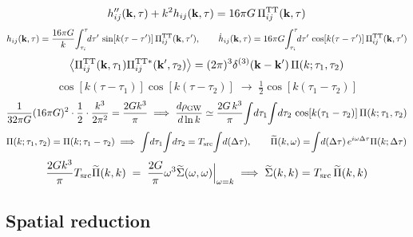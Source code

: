 \documentclass[10pt,prd,aps,nobibnotes,superscriptaddress,preprintnumbers,notitlepage]{revtex4-1}
\newcommand{\kb}{{\bf k}}
\begin{document}
\begin{equation}
  h_{ij}''(\kb,\tau)+k^2h_{ij}(\kb,\tau)=16\pi G\,\Pi^{\rm TT}_{ij}(\kb,\tau)
  \label{A:osc}
\end{equation}
\begin{equation}
  h_{ij}(\kb,\tau)=\frac{16\pi G}{k}\!\int_{\tau_i}^{\tau}\!\!d\tau'\,\sin[k(\tau-\tau')]\,\Pi^{\rm TT}_{ij}(\kb,\tau'),
  \qquad
  \dot h_{ij}(\kb,\tau)=16\pi G\!\int_{\tau_i}^{\tau}\!\!d\tau'\,\cos[k(\tau-\tau')]\,\Pi^{\rm TT}_{ij}(\kb,\tau')
  \label{A:green}
\end{equation}
\begin{equation}
  \bigl\langle\Pi^{\rm TT}_{ij}(\kb,\tau_1)\Pi^{{\rm TT}*}_{ij}(\kb',\tau_2)\bigr\rangle
  =(2\pi)^3\delta^{(3)}(\kb-\kb')\,\Pi(k;\tau_1,\tau_2)
  \label{A:uetc}
\end{equation}
\begin{equation}
  \cos[k(\tau-\tau_1)]\cos[k(\tau-\tau_2)]\;\longrightarrow\;\tfrac12\cos[k(\tau_1-\tau_2)]
  \label{A:average}
\end{equation}
\begin{equation}
  \frac{1}{32\pi G}(16\pi G)^2\cdot\frac12\cdot\frac{k^3}{2\pi^2}=\frac{2Gk^3}{\pi}
  \;\Longrightarrow\;
  \frac{d\rho_{\rm GW}}{d\ln k}\simeq\frac{2G\,k^3}{\pi}\!\int\!d\tau_1\!\int\!d\tau_2\,
  \cos[k(\tau_1-\tau_2)]\,\Pi(k;\tau_1,\tau_2)
  \label{A:master}
\end{equation}
\begin{equation}
  \Pi(k;\tau_1,\tau_2)=\Pi(k;\tau_1-\tau_2)
  \;\Longrightarrow\;
  \int\!d\tau_1\!\int\!d\tau_2=T_{\rm src}\!\int\!d(\Delta\tau),
  \qquad
  \widetilde\Pi(k,\omega)=\!\int\!d(\Delta\tau)\,e^{i\omega\Delta\tau}\Pi(k;\Delta\tau)
  \label{A:stationary}
\end{equation}
\begin{equation}
  \frac{2Gk^3}{\pi}T_{\rm src}\widetilde\Pi(k,k)
  \;=\;\frac{2G}{\pi}\omega^3\widetilde\Sigma(\omega,\omega)\Big|_{\omega=k}
  \;\Longrightarrow\;
  \widetilde\Sigma(k,k)=T_{\rm src}\,\widetilde\Pi(k,k)
  \label{A:consistency}
\end{equation}


\subsection{Spatial reduction}
\label{sec:chain-spatial}
\end{document}

